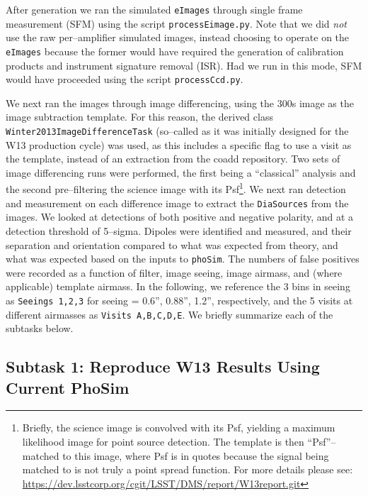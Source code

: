 \documentclass[DM,toc]{lsstdoc}
\begin{document}
After generation we ran the simulated {\tt eImages} through single
frame measurement (SFM) using the script {\tt processEimage.py}.  Note
that we did {\it not} use the raw per--amplifier simulated images,
instead choosing to operate on the {\tt eImages} because the former
would have required the generation of calibration products and
instrument signature removal (ISR).  Had we run in this mode, SFM
would have proceeded using the script {\tt processCcd.py}.

We next ran the images through image differencing, using the 300s
image as the image subtraction template.  For this reason, the derived
class {\tt Winter2013ImageDifferenceTask} (so--called as it was
initially designed for the W13 production cycle) was used, as this
includes a specific flag to use a visit as the template, instead of an
extraction from the coadd repository.  Two sets of image differencing
runs were performed, the first being a ``classical'' analysis and the
second pre--filtering the science image with its Psf\footnote{Briefly,
  the science image is convolved with its Psf, yielding a maximum
  likelihood image for point source detection.  The template is then
  ``Psf''--matched to this image, where Psf is in quotes because the
  signal being matched to is not truly a point spread function.  For
  more details please see:
  \url{https://dev.lsstcorp.org/cgit/LSST/DMS/report/W13report.git}}.
We next ran detection and measurement on each difference image to
extract the {\tt DiaSources} from the images.  We looked at detections
of both positive and negative polarity, and at a detection threshold
of 5--sigma.  Dipoles were identified and measured, and their
separation and orientation compared to what was expected from theory,
and what was expected based on the inputs to {\tt phoSim}.  The
numbers of false positives were recorded as a function of filter,
image seeing, image airmass, and (where applicable) template airmass.
In the following, we reference the 3 bins in seeing as {\tt Seeings
  1,2,3} for seeing = 0.6'', 0.88'', 1.2'', respectively, and the 5
visits at different airmasses as {\tt Visits A,B,C,D,E}.  We briefly
summarize each of the subtasks below.

\subsection{Subtask 1: Reproduce W13 Results Using Current PhoSim}
\end{document}
